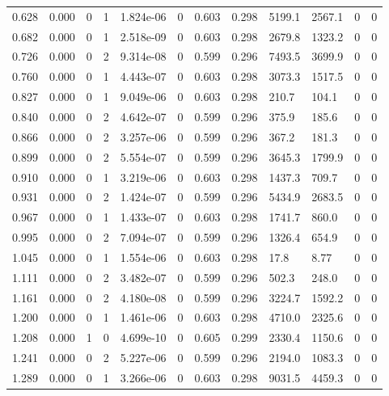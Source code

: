 \documentclass[preview]{standalone}
\begin{document}
{{\begin{tabular}{L{1.2cm}C{1.2cm} C{0.3cm}C{0.5cm} C{1.4cm}C{1.4cm} C{1.4cm}C{1.4cm} C{1.6cm}C{1.6cm} C{1.6cm}C{1.6cm}}
  0.628  &  0.000  & 0     &  1 &  1.824e-06  & 0  &  0.603&   0.298& 5199.1 & 2567.1   &  0 & 0  \\ 
  0.682  &  0.000  & 0     &  1 &  2.518e-09  & 0  &  0.603&   0.298& 2679.8 & 1323.2   &  0 & 0  \\ 
  0.726  &  0.000  & 0     &  2 &  9.314e-08  & 0  &  0.599&   0.296& 7493.5 & 3699.9   &  0 & 0  \\ 
  0.760  &  0.000  & 0     &  1 &  4.443e-07  & 0  &  0.603&   0.298& 3073.3 & 1517.5   &  0 & 0  \\ 
  0.827  &  0.000  & 0     &  1 &  9.049e-06  & 0  &  0.603&   0.298& 210.7 & 104.1   &  0 & 0  \\ 
  0.840  &  0.000  & 0     &  2 &  4.642e-07  & 0  &  0.599&   0.296& 375.9 & 185.6   &  0 & 0  \\ 
  0.866  &  0.000  & 0     &  2 &  3.257e-06  & 0  &  0.599&   0.296& 367.2 & 181.3   &  0 & 0  \\ 
  0.899  &  0.000  & 0     &  2 &  5.554e-07  & 0  &  0.599&   0.296& 3645.3 & 1799.9   &  0 & 0  \\ 
  0.910  &  0.000  & 0     &  1 &  3.219e-06  & 0  &  0.603&   0.298& 1437.3 & 709.7   &  0 & 0  \\ 
  0.931  &  0.000  & 0     &  2 &  1.424e-07  & 0  &  0.599&   0.296& 5434.9 & 2683.5   &  0 & 0  \\ 
  0.967  &  0.000  & 0     &  1 &  1.433e-07  & 0  &  0.603&   0.298& 1741.7 & 860.0   &  0 & 0  \\ 
  0.995  &  0.000  & 0     &  2 &  7.094e-07  & 0  &  0.599&   0.296& 1326.4 & 654.9   &  0 & 0  \\ 
  1.045  &  0.000  & 0     &  1 &  1.554e-06  & 0  &  0.603&   0.298& 17.8 & 8.77   &  0 & 0  \\ 
  1.111  &  0.000  & 0     &  2 &  3.482e-07  & 0  &  0.599&   0.296& 502.3 & 248.0   &  0 & 0  \\ 
  1.161  &  0.000  & 0     &  2 &  4.180e-08  & 0  &  0.599&   0.296& 3224.7 & 1592.2   &  0 & 0  \\ 
  1.200  &  0.000  & 0     &  1 &  1.461e-06  & 0  &  0.603&   0.298& 4710.0 & 2325.6   &  0 & 0  \\ 
  1.208  &  0.000  & 1     &  0 &  4.699e-10  & 0  &  0.605&   0.299& 2330.4 & 1150.6   &  0 & 0  \\ 
  1.241  &  0.000  & 0     &  2 &  5.227e-06  & 0  &  0.599&   0.296& 2194.0 & 1083.3   &  0 & 0  \\ 
  1.289  &  0.000  & 0     &  1 &  3.266e-06  & 0  &  0.603&   0.298& 9031.5 & 4459.3   &  0 & 0  \\ 

\end{tabular}}}
\end{document}
